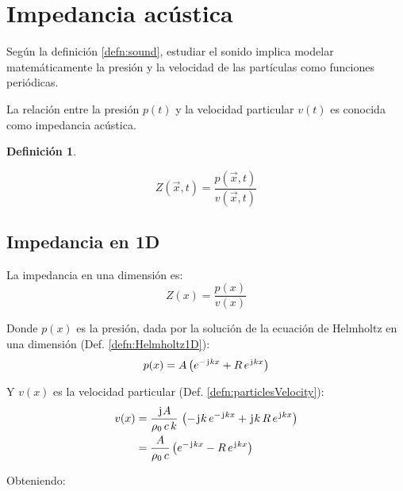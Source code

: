 \documentclass[a5paper,12pt,twoside]{book}
\newtheorem{defn}{{Definición}}[chapter]
\begin{document}
\section{Impedancia acústica}

Según la definición \ref{defn:sound}, estudiar el sonido implica modelar matemáticamente la presión y la velocidad de las partículas como funciones periódicas.

La relación entre la presión $p(t)$ y la velocidad particular $v(t)$ es conocida como impedancia acústica.

\begin{mdframed}[style=DefinitionFrame]
    \begin{defn}
        \label{defn:impedance}
    \end{defn}
    \begin{equation*}
        Z \left(\Vec{x},t\right) = \frac{p \left(\Vec{x},t\right)}{v \left(\Vec{x},t\right)}
    \end{equation*}
\end{mdframed}


\subsection*{Impedancia en 1D}

La impedancia en una dimensión es:
\begin{equation*}
    Z(x) = \frac{p(x)}{v(x)}
\end{equation*}

Donde $p(x)$ es la presión, dada por la solución de la ecuación de Helmholtz en una dimensión (Def. \ref{defn:Helmholtz1D}):
\begin{equation*}
    p(x) = A \left( e^{-\mkern2mu\mathrm{j}\mkern1mu k x} + R \, e^{\mkern2mu\mathrm{j}\mkern1mu k x} \right)
\end{equation*}

Y $v(x)$ es la velocidad particular (Def. \ref{defn:particlesVelocity}):
\begin{align}
    v(x) &= \frac{\mkern2mu\mathrm{j}\mkern1mu A}{\rho_0 \, c \, k} \, \left( -\mkern2mu\mathrm{j}\mkern1mu k \, e^{-\mkern2mu\mathrm{j}\mkern1mu k x} + \mkern2mu\mathrm{j}\mkern1mu k \, R \, e^{\mkern2mu\mathrm{j}\mkern1mu k x} \right)
    \notag
    \\
    &= \frac{A}{\rho_0 \, c} \left( e^{-\mkern2mu\mathrm{j}\mkern1mu k x} - R \, e^{\mkern2mu\mathrm{j}\mkern1mu k x} \right)
    \label{eqn:particleVel1D}
\end{align}

Obteniendo:
\end{document}
